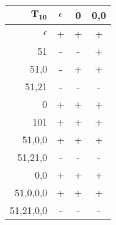 \begingroup
\scriptsize
\begin{tabular}{r | c c c}
    $\mathbf{T_{10}}$ & $\epsilon$ & 0 & 0,0\\ \hline
    $\epsilon$ & + & + & + \\
    51 & - & - & + \\
    51,0 & - & + & + \\
    51,21 & - & - & - \\ \hline
    0 & + & + & + \\
    101 & + & + & + \\
    51,0,0 & + & + & + \\
    51,21,0 & - & - & - \\
    0,0 & + & + & + \\
    51,0,0,0 & + & + & + \\
    51,21,0,0 & - & - & -
\end{tabular}
\endgroup
